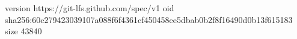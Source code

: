 version https://git-lfs.github.com/spec/v1
oid sha256:60c279423039107a088f6f4361cf450458ee5dbab0b2f8f16490d0b13f615183
size 43840
